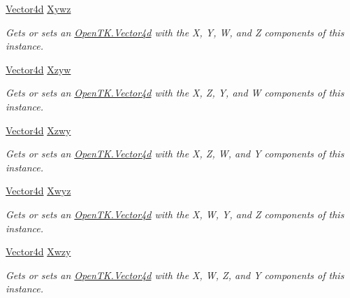 \begin{DoxyCompactItemize}
\hyperlink{struct_open_t_k_1_1_vector4d}{Vector4d} \hyperlink{struct_open_t_k_1_1_vector4d_afed3244397fa89920cf800221490e988}{Xywz}
\begin{DoxyCompactList}\small\item\em Gets or sets an \hyperlink{struct_open_t_k_1_1_vector4d}{Open\-T\-K.\-Vector4d} with the X, Y, W, and Z components of this instance. \end{DoxyCompactList}\item 
\hyperlink{struct_open_t_k_1_1_vector4d}{Vector4d} \hyperlink{struct_open_t_k_1_1_vector4d_a4c645af829f25930623587c73d88e151}{Xzyw}
\begin{DoxyCompactList}\small\item\em Gets or sets an \hyperlink{struct_open_t_k_1_1_vector4d}{Open\-T\-K.\-Vector4d} with the X, Z, Y, and W components of this instance. \end{DoxyCompactList}\item 
\hyperlink{struct_open_t_k_1_1_vector4d}{Vector4d} \hyperlink{struct_open_t_k_1_1_vector4d_a6f89fd12856113a06849c4693875b7bd}{Xzwy}
\begin{DoxyCompactList}\small\item\em Gets or sets an \hyperlink{struct_open_t_k_1_1_vector4d}{Open\-T\-K.\-Vector4d} with the X, Z, W, and Y components of this instance. \end{DoxyCompactList}\item 
\hyperlink{struct_open_t_k_1_1_vector4d}{Vector4d} \hyperlink{struct_open_t_k_1_1_vector4d_abf4e9988c0495a9a8eee3c6068368719}{Xwyz}
\begin{DoxyCompactList}\small\item\em Gets or sets an \hyperlink{struct_open_t_k_1_1_vector4d}{Open\-T\-K.\-Vector4d} with the X, W, Y, and Z components of this instance. \end{DoxyCompactList}\item 
\hyperlink{struct_open_t_k_1_1_vector4d}{Vector4d} \hyperlink{struct_open_t_k_1_1_vector4d_a96c112078c860364f036800fe2209618}{Xwzy}
\begin{DoxyCompactList}\small\item\em Gets or sets an \hyperlink{struct_open_t_k_1_1_vector4d}{Open\-T\-K.\-Vector4d} with the X, W, Z, and Y components of this instance. \end{DoxyCompactList}\item 

\end{DoxyCompactItemize}
